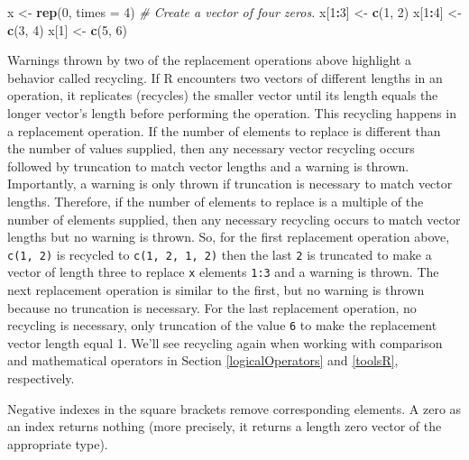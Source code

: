 \documentclass[
  11pt,
]{krantz}
\newenvironment{Shaded}{\begin{snugshade}}{\end{snugshade}}
\newcommand{\CommentTok}[1]{\textcolor[rgb]{0.56,0.35,0.01}{\textit{#1}}}
\newcommand{\DataTypeTok}[1]{\textcolor[rgb]{0.13,0.29,0.53}{#1}}
\newcommand{\DecValTok}[1]{\textcolor[rgb]{0.00,0.00,0.81}{#1}}
\newcommand{\KeywordTok}[1]{\textcolor[rgb]{0.13,0.29,0.53}{\textbf{#1}}}
\newcommand{\NormalTok}[1]{#1}
\newcommand{\OperatorTok}[1]{\textcolor[rgb]{0.81,0.36,0.00}{\textbf{#1}}}
\newcommand{\StringTok}[1]{\textcolor[rgb]{0.31,0.60,0.02}{#1}}
\theoremstyle{definition}
\theoremstyle{definition}
\theoremstyle{definition}
\theoremstyle{definition}
\theoremstyle{remark}
\begin{document}
\begin{Shaded}
\begin{Highlighting}[]
\NormalTok{x \textless{}{-}}\StringTok{ }\KeywordTok{rep}\NormalTok{(}\DecValTok{0}\NormalTok{, }\DataTypeTok{times =} \DecValTok{4}\NormalTok{) }\CommentTok{\# Create a vector of four zeros. }
\NormalTok{x[}\DecValTok{1}\OperatorTok{:}\DecValTok{3}\NormalTok{] \textless{}{-}}\StringTok{ }\KeywordTok{c}\NormalTok{(}\DecValTok{1}\NormalTok{, }\DecValTok{2}\NormalTok{)}
\NormalTok{x[}\DecValTok{1}\OperatorTok{:}\DecValTok{4}\NormalTok{] \textless{}{-}}\StringTok{ }\KeywordTok{c}\NormalTok{(}\DecValTok{3}\NormalTok{, }\DecValTok{4}\NormalTok{)}
\NormalTok{x[}\DecValTok{1}\NormalTok{] \textless{}{-}}\StringTok{ }\KeywordTok{c}\NormalTok{(}\DecValTok{5}\NormalTok{, }\DecValTok{6}\NormalTok{)}
\end{Highlighting}
\end{Shaded}

Warnings thrown by two of the replacement operations above highlight a behavior called recycling. If R encounters two vectors of different lengths in an operation, it replicates (recycles) the smaller vector until its length equals the longer vector's length before performing the operation. This recycling happens in a replacement operation. If the number of elements to replace is different than the number of values supplied, then any necessary vector recycling occurs followed by truncation to match vector lengths and a warning is thrown. Importantly, a warning is only thrown if truncation is necessary to match vector lengths. Therefore, if the number of elements to replace is a multiple of the number of elements supplied, then any necessary recycling occurs to match vector lengths but no warning is thrown. So, for the first replacement operation above, \texttt{c(1,\ 2)} is recycled to \texttt{c(1,\ 2,\ 1,\ 2)} then the last \texttt{2} is truncated to make a vector of length three to replace \texttt{x} elements \texttt{1:3} and a warning is thrown. The next replacement operation is similar to the first, but no warning is thrown because no truncation is necessary. For the last replacement operation, no recycling is necessary, only truncation of the value \texttt{6} to make the replacement vector length equal 1. We'll see recycling again when working with comparison and mathematical operators in Section \ref{logicalOperators} and \ref{toolsR}, respectively.

Negative indexes in the square brackets remove corresponding elements. A zero as an index returns nothing (more precisely, it returns a length zero vector of the appropriate type).
\end{document}
